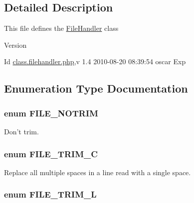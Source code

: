 \subsection{Detailed Description}
This file defines the \hyperlink{classFileHandler}{FileHandler} class \begin{DoxyVersion}{Version}

\end{DoxyVersion}
\begin{DoxyParagraph}{Id}
\hyperlink{class_8filehandler_8php}{class.filehandler.php},v 1.4 2010-\/08-\/20 08:39:54 oscar Exp 
\end{DoxyParagraph}


\subsection{Enumeration Type Documentation}
\subsubsection[{FILE\_\-NOTRIM}]{\setlength{\rightskip}{0pt plus 5cm}enum {\bf FILE\_\-NOTRIM}}\label{class_8imagehandler_8php_a3720f2e15eb9e16e29d8ecbb96763662}


Don't trim. 

\subsubsection[{FILE\_\-TRIM\_\-C}]{\setlength{\rightskip}{0pt plus 5cm}enum {\bf FILE\_\-TRIM\_\-C}}\label{class_8imagehandler_8php_a2787c3a1ecef8697c863800d0b2848a4}


Replace all multiple spaces in a line read with a single space. 

\subsubsection[{FILE\_\-TRIM\_\-L}]{\setlength{\rightskip}{0pt plus 5cm}enum {\bf FILE\_\-TRIM\_\-L}}\label{class_8imagehandler_8php_a080de95fd7cf2e8d8ac78ac7ad9471ee}


